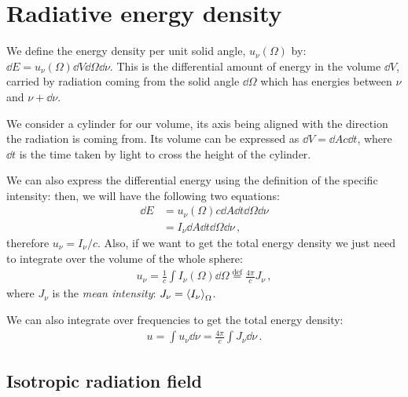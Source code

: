 \documentclass[main.tex]{subfiles}
\begin{document}

\section{Radiative energy density}

We define the energy density per unit solid angle, \(u_{\nu }(\Omega )\) by: \(\dd{E} = u_{\nu } (\Omega ) \dd{V} \dd{\Omega } \dd{\nu }\).
This is the differential amount of energy in the volume \(\dd{V}\), carried by radiation coming from the solid angle \(\dd{\Omega }\) which has energies between  \(\nu \) and \(\nu + \dd{\nu }\). 

We consider a cylinder for our volume, its axis being aligned with the direction the radiation is coming from. 
Its volume can be expressed as \(\dd{V} =\dd{A} c \dd{t}\), where \(\dd{t}\) is the time taken by light to cross the height of the cylinder.

We can also express the differential energy using the definition of the specific intensity: then, we will have the following two equations: 
%
\begin{subequations}
\begin{align}
\dd{E} &= u_{\nu } (\Omega ) c \dd{A} \dd{t} \dd{\Omega } \dd{\nu }  \\
&= I_{\nu } \dd{A} \dd{t} \dd{\Omega } \dd{\nu }
\,,
\end{align}
\end{subequations}
%
therefore \(u_{\nu } = I_{ \nu } / c\).
Also, if we want to get the total energy density we just need to integrate over the volume of the whole sphere: 
%
\begin{align}
u_{\nu } = \frac{1}{c} \int I_{\nu }  (\Omega ) \dd{\Omega }
\overset{\text{def}}{=} \frac{4 \pi }{c} J_{\nu }
\,,
\end{align}
%
where \(J_{\nu  }\) is the \emph{mean intensity}: \(J_{\nu } = \expval{I_{\nu }}_{\Omega }\). 

We can also integrate over frequencies to get the total energy density: 
%
\begin{align}
u = \int u_{\nu } \dd{\nu } = \frac{4 \pi }{c} \int J_{\nu } \dd{\nu }
\,.
\end{align}

\subsection{Isotropic radiation field}
\end{document}
